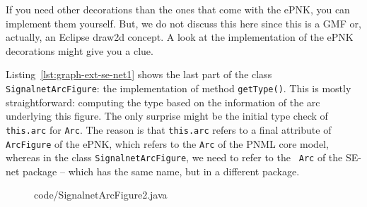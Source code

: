 If you need other decorations than the ones that come with the ePNK, you can
implement them yourself. But, we do not discuss this here since this is
a GMF or, actually, an Eclipse draw2d concept. A look at the implementation of
the ePNK decorations might give you a clue.

Listing~\ref{lst:graph-ext-se-net1} shows the last part of the class {\tt
SignalnetArcFigure}: the implementation of method {\tt  getType()}. This
is mostly straightforward: computing the type based on the information
of the arc underlying this figure. The only surprise might be the
initial type check of {\tt this.arc} for {\tt Arc}. The reason is
that {\tt this.arc} refers to a final attribute of {\tt ArcFigure}
of the ePNK, which refers to the {\tt Arc} of the PNML core model,
whereas in the class {\tt SignalnetArcFigure}, we need to refer to the {\tt
Arc} of the SE-net package -- which has the same name, but in a different
package.
%
\begin{figure}[htbp!]
%
{code/SignalnetArcFigure2.java}
\end{figure}

